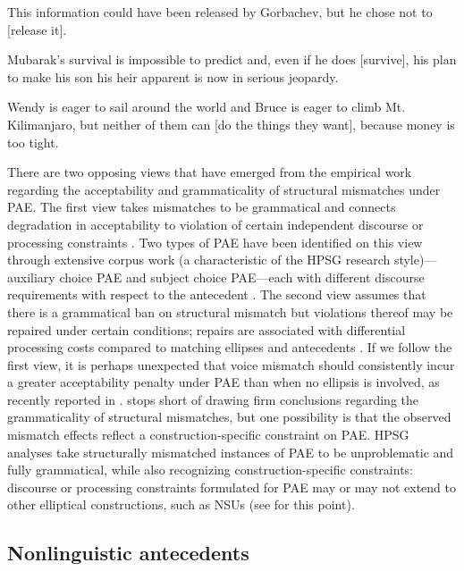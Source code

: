 {\eal

\ex This information could have been released by Gorbachev, but he chose not to [release it]. \citep[37]{Hardt1993} \label{27}

\ex Mubarak's survival is impossible to predict and, even if he does [survive], his plan to make his son his heir apparent is now in serious jeopardy. \citep{Miller2014a} \label{28}

\ex Wendy is eager to sail around the world and Bruce is eager to climb Mt. Kilimanjaro, but neither of them can [do the things they want], because money is too tight. \citep{Webber79a} \label{29}
\zl

There are two opposing views that have emerged from the empirical work regarding the acceptability and grammaticality of structural mismatches under PAE. The first view takes mismatches to be grammatical and connects degradation in acceptability to violation of certain independent discourse \citep{Kehler2002, Miller2011, %
Miller2014, Miller2014a, Miller2014b} or processing constraints \citep{Kim2011}. Two types of PAE have been identified on this view through extensive corpus work (a characteristic of the HPSG research style)---auxiliary choice PAE and subject choice PAE---each with different discourse requirements with respect to the antecedent \citep{Miller2011, Miller2014a, Miller2014b}. The second view assumes that there is a grammatical ban on structural mismatch but violations thereof may be repaired under certain conditions; repairs are associated with differential processing costs compared to matching ellipses and antecedents \citep{Arregui2006, Grant2012}. If we follow the first view, it is perhaps unexpected that voice mismatch should consistently incur a greater acceptability penalty under PAE than when no ellipsis is involved, as recently reported in \citet{Kim2011}. \citet{Kim2011} stops short of drawing firm conclusions regarding the grammaticality of structural mismatches, but one possibility is that the observed mismatch effects reflect a construction-specific constraint on PAE. HPSG analyses take structurally mismatched instances of PAE to be unproblematic and fully grammatical, while also recognizing construction-specific constraints: discourse or processing constraints formulated for PAE may or may not extend to other elliptical constructions, such as NSUs (see \citealt{Abeille2016,Ginzburg2018} for this point).


\subsection{Nonlinguistic antecedents}
\label{sec-nonlinguistic-antecedents}

}
